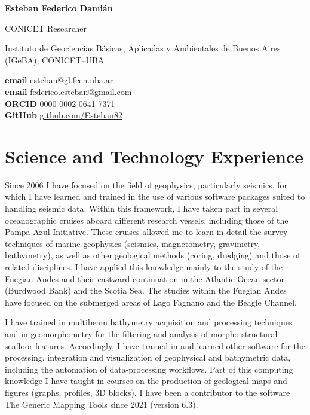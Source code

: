 \documentclass[11pt, a4paper]{article}
\makeatletter
\newcommand{\fullname}{Esteban Federico Damián}
\newcommand{\email}{esteban@gl.fcen.uba.ar}
\newcommand{\emailalt}{federico.esteban@gmail.com}
\newcommand{\github}{Esteban82}
\newcommand{\orcid}{0000-0002-0641-7371}
\newcommand{\maintitle}[1]{%
  \begin{flushleft}
    \textbf{\Huge #1}
  \end{flushleft}
}
\newcommand{\subtitle}[1]{%
  \begin{flushleft}
    {\LARGE #1}
  \end{flushleft}
}
\newcommand{\affiliation}[1]{%
  \begin{flushleft}
    {\large #1}
  \end{flushleft}
}
\newcommand{\MAIL}[1]{\href{mailto:#1}{#1}}
\newcommand{\GITHUB}[1]{\href{https://github.com/#1}{github.com/#1}}
\newcommand{\ORCID}[1]{\href{https://orcid.org/#1}{#1}}
\newcommand{\isodate}{\number\year-\ifnum\month<10 0\fi\number\month-\ifnum\day<10 0\fi\number\day}
\makeatother
\begin{document}

\maintitle{\fullname}

\begin{minipage}[t]{0.58\linewidth}
  \begin{flushleft}
    \subtitle{CONICET Researcher}
    \affiliation{Instituto de Geociencias Básicas, Aplicadas y Ambientales de Buenos Aires (IGeBA), CONICET--UBA}
  \end{flushleft}
\end{minipage}
\hfill
\begin{minipage}[t]{0.40\linewidth}
  \begin{flushright}
    \textbf{email} \MAIL{\email}
    \\
    \textbf{email} \MAIL{\emailalt}
    \\
    \textbf{ORCID} \ORCID{\orcid}
    \\
    \textbf{GitHub} \GITHUB{\github}
    \\
    \color{mygray}{Last modified: \isodate}
  \end{flushright}
\end{minipage}

\section{Science and Technology Experience}

Since 2006 I have focused on the field of geophysics, particularly seismics, for which I have learned and trained in the use of various software packages suited to handling seismic data. Within this framework, I have taken part in several oceanographic cruises aboard different research vessels, including those of the Pampa Azul Initiative. These cruises allowed me to learn in detail the survey techniques of marine geophysics (seismics, magnetometry, gravimetry, bathymetry), as well as other geological methods (coring, dredging) and those of related disciplines. I have applied this knowledge mainly to the study of the Fuegian Andes and their eastward continuation in the Atlantic Ocean sector (Burdwood Bank) and the Scotia Sea. The studies within the Fuegian Andes have focused on the submerged areas of Lago Fagnano and the Beagle Channel.

I have trained in multibeam bathymetry acquisition and processing techniques and in geomorphometry for the filtering and analysis of morpho-structural seafloor features. Accordingly, I have trained in and learned other software for the processing, integration and visualization of geophysical and bathymetric data, including the automation of data-processing workflows. Part of this computing knowledge I have taught in courses on the production of geological maps and figures (graphs, profiles, 3D blocks). I have been a contributor to the software The Generic Mapping Tools since 2021 (version 6.3).
\end{document}
